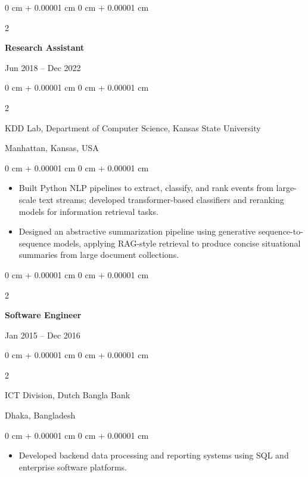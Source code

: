 \documentclass[10pt, letterpaper]{article}
\newenvironment{highlights}{
    \begin{itemize}[
        topsep=0.10 cm,
        parsep=0.10 cm,
        partopsep=0pt,
        itemsep=0pt,
        leftmargin=0 cm + 10pt
    ]
}{
    \end{itemize}
} %
\newenvironment{onecolentry}{
    \begin{adjustwidth}{
        0 cm + 0.00001 cm
    }{
        0 cm + 0.00001 cm
    }
}{
    \end{adjustwidth}
} %
\newenvironment{twocolentry}[2][]{
    \onecolentry
    \def\secondColumn{#2}
    \setcolumnwidth{\fill, 4.5 cm}
    \begin{paracol}{2}
}{
    \switchcolumn \raggedleft \secondColumn
    \end{paracol}
    \endonecolentry
} %
\begin{document}
    \vspace{1mm}
    
    \begin{twocolentry}{Jun 2018 -- Dec 2022}
        \textbf{Research Assistant}
    \end{twocolentry}
    \begin{twocolentry}{Manhattan, Kansas, USA}
       KDD Lab, Department of Computer Science, Kansas State University
    \end{twocolentry}
    \vspace{0.10 cm}
    \begin{onecolentry}
        \begin{highlights}
            \item Built Python NLP pipelines to extract, classify, and rank events from large-scale text streams; developed transformer-based classifiers and reranking models for information retrieval tasks.
            \item Designed an abstractive summarization pipeline using generative sequence-to-sequence models, applying RAG-style retrieval to produce concise situational summaries from large document collections.
        \end{highlights}
    \end{onecolentry}

    \vspace{0.1 cm}
    \begin{twocolentry}{Jan 2015 -- Dec 2016}
        \textbf{Software Engineer}
    \end{twocolentry}
    \begin{twocolentry}{Dhaka, Bangladesh}
       ICT Division, Dutch Bangla Bank
    \end{twocolentry}
    
    \begin{onecolentry}
        \begin{highlights}
            \item Developed backend data processing and reporting systems using SQL and enterprise software platforms.
        \end{highlights}
    \end{onecolentry}
    
\end{document}
